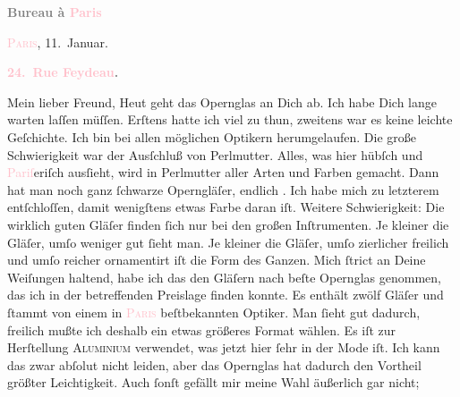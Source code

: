            \pstart
           \begin{otherlanguage}{french}\textcolor{gray}{\textbf{\textbf{Bureau à \textcolor{pink}{Paris}{}\ledrightnote{\textcolor{pink}{Paris}}}}}\end{otherlanguage}\hfill \textsc{\textcolor{pink}{Paris}{}\ledrightnote{\textcolor{pink}{Paris}}}, 11. Januar.\pend
           \pstart
           \begin{otherlanguage}{french}\textcolor{gray}{\textbf{\textbf{\textcolor{pink}{24. Rue Feydeau}{}\ledrightnote{\textcolor{pink}{rue Feydeau}}.}}}\end{otherlanguage}\pend
           \pstart\center{}Mein lieber Freund,\pend\pstart
           Heut geht das Opernglas an Dich ab. Ich habe Dich
               lange warten laſſen müſſen. Erſtens hatte ich viel zu thun, zweitens war es keine
               leichte Geſchichte. Ich bin bei allen möglichen Optikern herumgelaufen. Die große
               Schwierigkeit war der Ausſchluß von Perlmutter. Alles, was hier hübſch und \textcolor{pink}{Pariſ}{}\ledrightnote{\textcolor{pink}{Paris}}eriſch ausſieht, wird in Perlmutter aller
               Arten und Farben gemacht. Dann hat man noch ganz ſchwarze {\pb}Operngläſer, endlich \label{K_L02762-1v}\label{K_L02762-1h}. Ich habe mich zu letzterem entſchloſſen, damit wenigſtens
               etwas Farbe daran iſt. Weitere Schwierigkeit: Die wirklich guten Gläſer finden ſich
               nur bei den großen Inſtrumenten. Je kleiner die Gläſer, umſo weniger gut ſieht man.
               Je kleiner die Gläſer, umſo zierlicher freilich und umſo reicher ornamentirt iſt die
               Form des Ganzen. Mich ſtrict an Deine Weiſungen haltend, habe ich das den Gläſern {\pb}nach beſte Opernglas genommen, das ich in  der betreffenden Preislage finden konnte. Es enthält
               zwölf Gläſer und ſtammt von einem in \textsc{\textcolor{pink}{Paris}{}\ledrightnote{\textcolor{pink}{Paris}}} beſtbekannten Optiker.  Man
               ſieht gut dadurch, freilich mußte ich deshalb ein etwas größeres Format wählen. Es
               iſt zur Herſtellung \textsc{Aluminium} verwendet, was jetzt hier
               ſehr in der Mode iſt. Ich kann das zwar abſolut nicht leiden, aber das Opernglas hat
               dadurch den Vortheil {\pb}größter Leichtigkeit. Auch
               ſonſt gefällt mir meine Wahl äußerlich gar nicht; 
